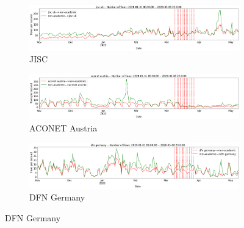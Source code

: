 \documentclass[10pt, journal, letterpaper]{IEEEtran}
\newcommand\linearFigSze{0.48}
\begin{document}
\begin{figure}
    \begin{subfigure}{\linearFigSze\textwidth}
          \centering
          \includegraphics[width=\columnwidth]{img/jisc_busi_fps.png}
          \caption{JISC}
          \label{fig:jisc_busi_fps}
    \end{subfigure}
    \begin{subfigure}{\linearFigSze\textwidth}
          \centering
          \includegraphics[width=\columnwidth]{img/aconet_busi_fps.png}
          \caption{ACONET Austria}
          \label{fig:aconet_busi_fps}
    \end{subfigure}
    \begin{subfigure}{\linearFigSze\textwidth}
          \centering
          \includegraphics[width=\columnwidth]{img/dfn_busi_fps.png}
          \caption{DFN Germany}
          \label{fig:dfn_busi_fps}
    \end{subfigure}

\end{figure}
\end{document}
